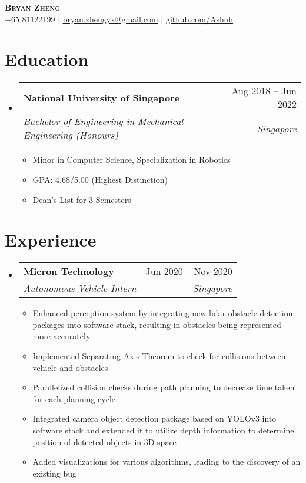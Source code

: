 \documentclass[letterpaper,11pt]{article}
\makeatletter
\newcommand{\resumeItem}[1]{
  \item\small{
    {#1 \vspace{-2pt}}
  }
}
\newcommand{\resumeSubheading}[4]{
  \vspace{-2pt}\item
    \begin{tabular*}{0.97\textwidth}[t]{l@{\extracolsep{\fill}}r}
      \textbf{#1} & #2 \\
      \textit{\small#3} & \textit{\small #4} \\
    \end{tabular*}\vspace{-7pt}
}
\newcommand{\resumeSubHeadingListStart}{\begin{itemize}[leftmargin=0.15in, label={}]}
\newcommand{\resumeSubHeadingListEnd}{\end{itemize}}
\newcommand{\resumeItemListStart}{\begin{itemize}}
\newcommand{\resumeItemListEnd}{\end{itemize}\vspace{-5pt}}
\makeatother
\begin{document}
\begin{center}
    \textbf{\Huge \scshape Bryan Zheng} \\ \vspace{1pt}
    \small +65 81122199 $|$ \href{mailto:bryan.zhengyx@gmail.com}{\underline{bryan.zhengyx@gmail.com}} $|$ 
    \href{https://github.com/Ashuh}{\underline{github.com/Ashuh}}
\end{center}


\section{Education}
  \resumeSubHeadingListStart
    \resumeSubheading
      {National University of Singapore}{Aug 2018 -- Jun 2022}
      {Bachelor of Engineering in Mechanical Engineering (Honours)}{Singapore}
    \resumeItemListStart
        \resumeItem{Minor in Computer Science, Specialization in Robotics}
        \resumeItem{GPA: 4.68/5.00 (Highest Distinction)}
        \resumeItem{Dean’s List for 3 Semesters}
      \resumeItemListEnd
  \resumeSubHeadingListEnd


\section{Experience}
  \resumeSubHeadingListStart
    \resumeSubheading
      {Micron Technology}{Jun 2020 -- Nov 2020}
      {Autonomous Vehicle Intern}{Singapore}
      \resumeItemListStart
        \resumeItem{Enhanced perception system by integrating new lidar obstacle detection packages into software stack, resulting in obstacles being represented more accurately}
        \resumeItem{Implemented Separating Axis Theorem to check for collisions between vehicle and obstacles}
        \resumeItem{Parallelized collision checks during path planning to decrease time taken for each planning cycle}
        \resumeItem{Integrated camera object detection package based on YOLOv3 into software stack and extended it to utilize depth information to determine position of detected objects in 3D space}
        \resumeItem{Added visualizations for various algorithms, leading to the discovery of an existing bug}
      \resumeItemListEnd
  \resumeSubHeadingListEnd


\end{document}
